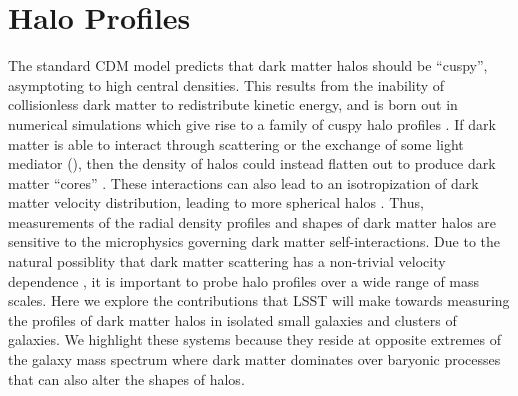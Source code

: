 \section{Halo Profiles} 
\label{sec:profiles}

The standard CDM model predicts that dark matter halos should be ``cuspy'', \ie asymptoting to high central densities.
This results from the inability of collisionless dark matter to redistribute kinetic energy, and is born out in numerical simulations which give rise to a family of cuspy halo profiles \citep[\eg, the NFW profile;][]{Navarro:1996gj}.
If dark matter is able to interact through scattering or the exchange of some light mediator (), then the density of halos could instead flatten out to produce dark matter ``cores'' \citep{Spergel:1999mh}.
These interactions can also lead to an isotropization of dark matter velocity distribution, leading to more spherical halos \citep{Peter:2013}.
Thus, measurements of the radial density profiles and shapes of dark matter halos are sensitive to the microphysics governing dark matter self-interactions.
Due to the natural possiblity that dark matter scattering has a non-trivial velocity dependence , it is important to probe halo profiles over a wide range of mass scales.
Here we explore the contributions that LSST will make towards measuring the profiles of dark matter halos in isolated small galaxies and clusters of galaxies.
We highlight these systems because they reside at opposite extremes of the galaxy mass spectrum where dark matter dominates over baryonic processes that can also alter the shapes of halos.




% 
% 

